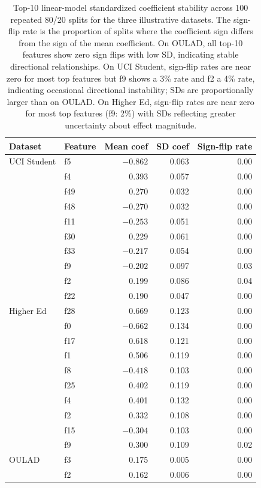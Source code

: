 \documentclass[10pt,letterpaper]{article}
\begin{document}
\begin{table}[!h]
\centering
\caption{Top-10 linear-model standardized coefficient stability across 100 repeated 80/20 splits for the three illustrative datasets. The sign-flip rate is the proportion of splits where the coefficient sign differs from the sign of the mean coefficient. On OULAD, all top-10 features show zero sign flips with low SD, indicating stable directional relationships. On UCI Student, sign-flip rates are near zero for most top features but f9 shows a 3\% rate and f2 a 4\% rate, indicating occasional directional instability; SDs are proportionally larger than on OULAD. On Higher Ed, sign-flip rates are near zero for most top features (f9: 2\%) with SDs reflecting greater uncertainty about effect magnitude.}
\label{tab:linear_coef_stability}
\small
\begin{tabular}{l l r r r}
\toprule
Dataset & Feature & Mean coef & SD coef & Sign-flip rate \\
\midrule
UCI Student & f5 & $-0.862$ & 0.063 & 0.00 \\
 & f4 & 0.393 & 0.057 & 0.00 \\
 & f49 & 0.270 & 0.032 & 0.00 \\
 & f48 & $-0.270$ & 0.032 & 0.00 \\
 & f11 & $-0.253$ & 0.051 & 0.00 \\
 & f30 & 0.229 & 0.061 & 0.00 \\
 & f33 & $-0.217$ & 0.054 & 0.00 \\
 & f9 & $-0.202$ & 0.097 & 0.03 \\
 & f2 & 0.199 & 0.086 & 0.04 \\
 & f22 & 0.190 & 0.047 & 0.00 \\
\midrule
Higher Ed & f28 & 0.669 & 0.123 & 0.00 \\
 & f0  & $-0.662$ & 0.134 & 0.00 \\
 & f17 & 0.618 & 0.121 & 0.00 \\
 & f1  & 0.506 & 0.119 & 0.00 \\
 & f8  & $-0.418$ & 0.103 & 0.00 \\
 & f25 & 0.402 & 0.119 & 0.00 \\
 & f4  & 0.401 & 0.132 & 0.00 \\
 & f2  & 0.332 & 0.108 & 0.00 \\
 & f15 & $-0.304$ & 0.103 & 0.00 \\
 & f9  & 0.300 & 0.109 & 0.02 \\
\midrule
OULAD & f3 & 0.175 & 0.005 & 0.00 \\
 & f2 & 0.162 & 0.006 & 0.00 \\

\end{tabular}
\end{table}
\end{document}
